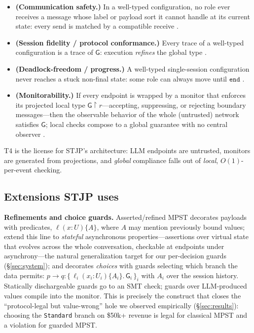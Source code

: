 \documentclass{article}
\newcommand{\gtG}{\mathsf{G}}
\newcommand{\ed}{\mathtt{end}}
\newcommand{\proj}[2]{#1\!\upharpoonright\!#2}
\newcommand{\sends}{\rightarrow}
\newcommand{\lbl}{\ell}
\newcommand{\stjp}{\textsc{STJP}}
\begin{document}
\begin{itemize}\itemsep1pt
\item[\textbf{T1}] \textbf{(Communication safety.)} In a well-typed configuration, no role ever receives a message whose label or payload sort it cannot handle at its current state: every send is matched by a compatible receive \citep{hyc08}.
\item[\textbf{T2}] \textbf{(Session fidelity / protocol conformance.)} Every trace of a well-typed configuration is a trace of $\gtG$: execution \emph{refines} the global type \citep{hyc08,scalas19}.
\item[\textbf{T3}] \textbf{(Deadlock-freedom / progress.)} A well-typed single-session configuration never reaches a stuck non-final state: some role can always move until $\ed$ \citep{hyc08,scalas19}.
\item[\textbf{T4}] \textbf{(Monitorability.)} If every endpoint is wrapped by a monitor that enforces its projected local type $\proj{\gtG}{r}$---accepting, suppressing, or rejecting boundary messages---then the observable behavior of the whole (untrusted) network satisfies $\gtG$; local checks compose to a global guarantee with no central observer \citep{bocchi13}.
\end{itemize}
T4 is the license for \stjp{}'s architecture: LLM endpoints are untrusted, monitors are generated from projections, and \emph{global} compliance falls out of \emph{local}, $O(1)$-per-event checking.

\subsection{Extensions \stjp{} uses}
\textbf{Refinements and choice guards.} Asserted/refined MPST \citep{bocchi10,refine24} decorates payloads with predicates, $\lbl(x{:}U)\{A\}$, where $A$ may mention previously bound values; \citet{chen12} extend this line to \emph{stateful} asynchronous properties---assertions over virtual state that evolves across the whole conversation, checkable at endpoints under asynchrony---the natural generalization target for our per-decision guards (\S\ref{sec:system}); and decorates \emph{choices} with guards selecting which branch the data permits:
$p \sends q : \{\,\lbl_i(x_i{:}U_i)\{A_i\}.\,\gtG_i\,\}_{i}$ with $A_i$ over the session history. Statically dischargeable guards go to an SMT check; guards over LLM-produced values compile into the monitor. This is precisely the construct that closes the ``protocol-legal but value-wrong'' hole we observed empirically (\S\ref{sec:results}): choosing the \texttt{Standard} branch on \$50k+ revenue is legal for classical MPST and a violation for guarded MPST.
\end{document}
